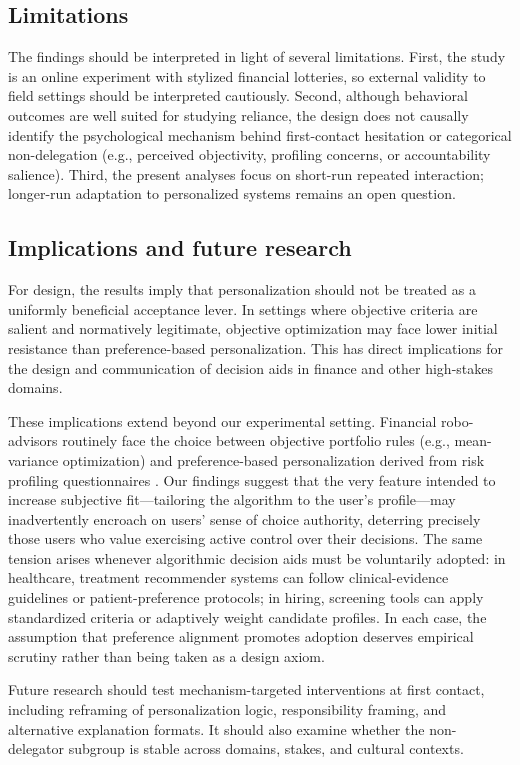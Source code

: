 \documentclass[a4paper, 12pt, fleqn]{article}
\theoremstyle{definition}
\begin{document}
\subsection{Limitations}
The findings should be interpreted in light of several limitations. First, the study is an online experiment with stylized financial lotteries, so external validity to field settings should be interpreted cautiously. Second, although behavioral outcomes are well suited for studying reliance, the design does not causally identify the psychological mechanism behind first-contact hesitation or categorical non-delegation (e.g., perceived objectivity, profiling concerns, or accountability salience). Third, the present analyses focus on short-run repeated interaction; longer-run adaptation to personalized systems remains an open question.

\subsection{Implications and future research}
For design, the results imply that personalization should not be treated as a uniformly beneficial acceptance lever. In settings where objective criteria are salient and normatively legitimate, objective optimization may face lower initial resistance than preference-based personalization. This has direct implications for the design and communication of decision aids in finance and other high-stakes domains.

These implications extend beyond our experimental setting. Financial robo-advisors routinely face the choice between objective portfolio rules (e.g., mean-variance optimization) and preference-based personalization derived from risk profiling questionnaires \citep{Capponi2022,Ruehr2020}. Our findings suggest that the very feature intended to increase subjective fit---tailoring the algorithm to the user's profile---may inadvertently encroach on users' sense of choice authority, deterring precisely those users who value exercising active control over their decisions. The same tension arises whenever algorithmic decision aids must be voluntarily adopted: in healthcare, treatment recommender systems can follow clinical-evidence guidelines or patient-preference protocols; in hiring, screening tools can apply standardized criteria or adaptively weight candidate profiles. In each case, the assumption that preference alignment promotes adoption deserves empirical scrutiny rather than being taken as a design axiom.

Future research should test mechanism-targeted interventions at first contact, including reframing of personalization logic, responsibility framing, and alternative explanation formats. It should also examine whether the non-delegator subgroup is stable across domains, stakes, and cultural contexts.
\end{document}
